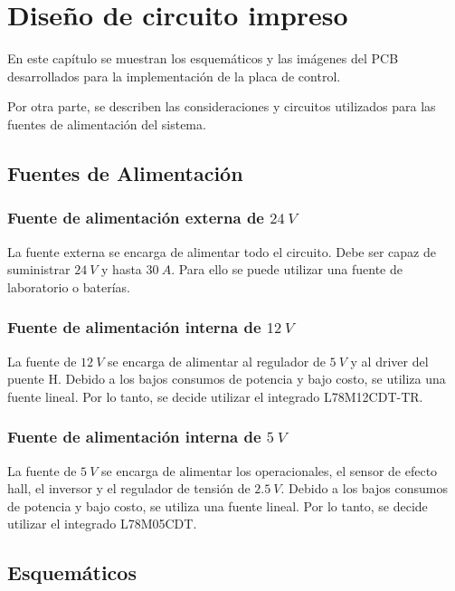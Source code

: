 \chapter{Diseño de circuito impreso}  \label{cap:PCB}


En este capítulo se muestran los esquemáticos y las imágenes del PCB desarrollados para la implementación de la placa de control. 

Por otra parte, se describen las consideraciones y circuitos utilizados para las fuentes de alimentación del sistema.


\section{Fuentes de Alimentación}

\subsection{Fuente de alimentación externa de $24\:V$}

\noindent La fuente externa se encarga de alimentar todo el circuito. Debe ser capaz de suministrar $24\:V$ y hasta $30\:A$. Para ello se puede utilizar una fuente de laboratorio o baterías.

\subsection{Fuente de alimentación interna de $12\:V$}

\noindent La fuente de $12\:V$ se encarga de alimentar al regulador de $5\:V$ y al driver del puente H. Debido a los bajos consumos de potencia y bajo costo, se utiliza una fuente lineal. Por lo tanto, se decide utilizar el integrado L78M12CDT-TR.

\subsection{Fuente de alimentación interna de $5\:V$}

La fuente de $5\:V$ se encarga de alimentar los operacionales, el sensor de efecto hall, el inversor y el regulador de tensión de $2.5\:V$. Debido a los bajos consumos de potencia y bajo costo, se utiliza una fuente lineal. Por lo tanto, se decide utilizar el integrado L78M05CDT.

\section{Esquemáticos}


